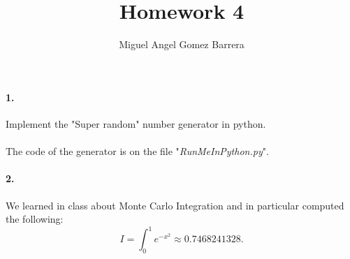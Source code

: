 \documentclass{article}
\title{Homework 4}
\author{Miguel Angel Gomez Barrera}
\begin{document}
	\maketitle
\paragraph{1.} Implement the "Super random" number generator in python.
\paragraph{} The code of the generator is on the file "\textit{RunMeInPython.py}".
\paragraph{2.} We learned in class about Monte Carlo Integration and in particular computed the following:
$$I = \int_{0}^{1} e^{-x^2} \approx 0.7468241328.$$
\end{document}
